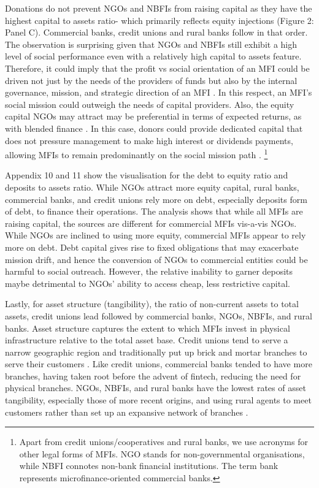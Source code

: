 \documentclass[a4paper,nobind]{templates/ociamthesis}
\begin{document}
Donations do not prevent NGOs and NBFIs from raising capital as they have the highest capital to assets ratio- which primarily reflects equity injections (Figure 2: Panel C). Commercial banks, credit unions and rural banks follow in that order. The observation is surprising given that NGOs and NBFIs still exhibit a high level of social performance even with a relatively high capital to assets feature. Therefore, it could imply that the profit vs social orientation of an MFI could be driven not just by the needs of the providers of funds but also by the internal governance, mission, and strategic direction of an MFI \autocite{campion1999institutional}. In this respect, an MFI's social mission could outweigh the needs of capital providers. Also, the equity capital NGOs may attract may be preferential in terms of expected returns, as with blended finance \autocite{rode2019blended}. In this case, donors could provide dedicated capital that does not pressure management to make high interest or dividends payments, allowing MFIs to remain predominantly on the social mission path \autocite{lopatta2016microfinance}. \footnote{Apart from credit unions/cooperatives and rural banks, we use acronyms for other legal forms of MFIs. NGO stands for non-governmental organisations, while NBFI connotes non-bank financial institutions. The term bank represents microfinance-oriented commercial banks.}

Appendix 10 and 11 show the visualisation for the debt to equity ratio and deposits to assets ratio. While NGOs attract more equity capital, rural banks, commercial banks, and credit unions rely more on debt, especially deposits form of debt, to finance their operations. The analysis shows that while all MFIs are raising capital, the sources are different for commercial MFIs vis-a-vis NGOs. While NGOs are inclined to using more equity, commercial MFIs appear to rely more on debt. Debt capital gives rise to fixed obligations that may exacerbate mission drift, and hence the conversion of NGOs to commercial entities could be harmful to social outreach. However, the relative inability to garner deposits maybe detrimental to NGOs' ability to access cheap, less restrictive capital.

Lastly, for asset structure (tangibility), the ratio of non-current assets to total assets, credit unions lead followed by commercial banks, NGOs, NBFIs, and rural banks. Asset structure captures the extent to which MFIs invest in physical infrastructure relative to the total asset base. Credit unions tend to serve a narrow geographic region and traditionally put up brick and mortar branches to serve their customers \autocite{mckillop2011credit}. Like credit unions, commercial banks tended to have more branches, having taken root before the advent of fintech, reducing the need for physical branches. NGOs, NBFIs, and rural banks have the lowest rates of asset tangibility, especially those of more recent origins, and using rural agents to meet customers rather than set up an expansive network of branches \autocite{kent2013bankers}.
\end{document}
